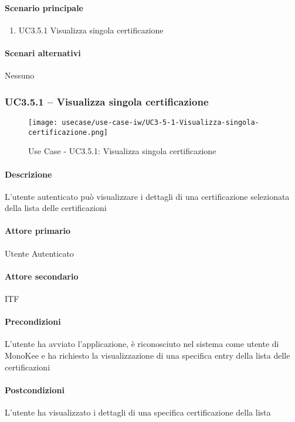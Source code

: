 \paragraph{Scenario principale}  
    \begin{enumerate}
        \item UC3.5.1 Visualizza singola certificazione
    \end{enumerate}
\paragraph{Scenari alternativi}  Nessuno





\subsubsection{UC3.5.1 – Visualizza singola certificazione}
\begin{figure}[!htbp] 
    \centering 
    \texttt{[image: usecase/use-case-iw/UC3-5-1-Visualizza-singola-certificazione.png]} 
    \caption{Use Case - UC3.5.1: Visualizza singola certificazione}
\end{figure}

\paragraph{Descrizione}  L’utente autenticato può visualizzare i dettagli di una certificazione selezionata della lista delle certificazioni
\paragraph{Attore primario}  Utente Autenticato
\paragraph{Attore secondario}  ITF
\paragraph{Precondizioni}  L’utente ha avviato l’applicazione, è riconosciuto nel sistema come utente di MonoKee e ha richiesto la visualizzazione di una specifica entry della lista delle certificazioni
\paragraph{Postcondizioni}  L’utente ha visualizzato i dettagli di una specifica certificazione della lista
